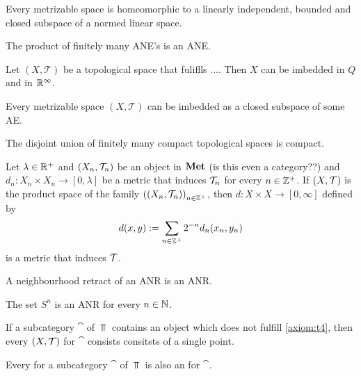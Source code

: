 \begin{theorem}
	Every metrizable space is homeomorphic to a linearly independent, bounded and closed subspace of a normed linear space. \cite[corollary1.1.8]{IDT}
\end{theorem}

\begin{proposition}
	The product of finitely many ANE's is an ANE.
\end{proposition}

\begin{corollary}
	Let $(X, \mathcal{T})$ be a topological space that fuliflls .... Then $X$ can be imbedded in $Q$ and in $\mathbb R^\infty$.
\end{corollary}

\begin{lemma}
	Every metrizable space $(X, \mathcal{T})$ can be imbedded as a closed subspace of some AE. 
\end{lemma}


\begin{lemma}
	The disjoint union of finitely many compact topological spaces is compact.
\end{lemma}

\begin{lemma}
	Let $\lambda \in \mathbb R^+$ and ${\left ( X_n, \mathcal{T}_n \right )}$ be an object in $\mathbf{Met}$ (is this even a category??) and $d_n: X_n \times X_n \to [0,\lambda]$ be a  metric that induces $\mathcal{T}_n$ for every $n \in \mathbb Z^+$. If $\tspace$ is the product space of the family ${\left ( {\left ( X_n, \mathcal{T}_n \right )} \right )}_{n \in \mathbb Z^+}$, then $d: X \times X \to [0, \infty]$ defined by
	\begin{align*}
		d(x,y) := \sum_{n \in \mathbb Z^+} 2^{-n} d_n(x_n, y_n)
	\end{align*}
	is a metric that induces $\mathcal{T}$. 
\end{lemma}

\begin{proposition}
	A neighbourhood retract of an ANR is an ANR. \cite[p. 40]{ToR}
\end{proposition}


\begin{corollary}
	The set $S^n$ is an ANR for every $n \in \mathbb N$. \cite[p. 42]{ToR}
\end{corollary}

\begin{proposition}
	If a subcategory $\cat$ of $\Top$ contains an object which does not fulfill \ref{axiom:t4}, then every \ane $\tspace$ for $\cat$ consists consitsts of a single point.  
\end{proposition}

\begin{proposition}
	Every \aex for a subcategory $\cat$ of $\Top$ is also an \ane for $\cat$.
\end{proposition}